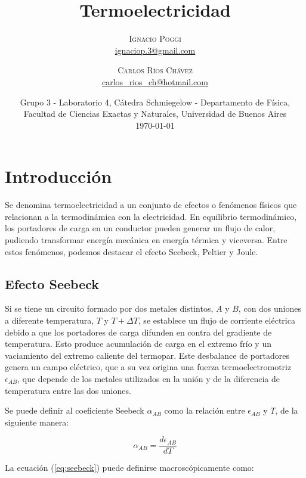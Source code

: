 \documentclass[twoside,twocolumn,a4paper]{article}
\title{Termoelectricidad} %
\author{%
\textsc{Ignacio Poggi} \\[1ex] %
\normalsize \href{mailto:ignaciop.3@gmail.com}{ignaciop.3@gmail.com} %
\and %
\textsc{Carlos R\'ios Ch\'avez} \\[1ex] %
\normalsize \href{mailto:carlos_rios_ch@hotmail.com}{carlos\_rios\_ch@hotmail.com} %
}
\date{Grupo 3 - Laboratorio 4, C\'atedra Schmiegelow - Departamento de F\'isica, Facultad de Ciencias Exactas y Naturales, Universidad de Buenos Aires \newline \\ \today} %
\begin{document}
\maketitle



\section{Introducci\'on}


Se denomina termoelectricidad a un conjunto de efectos o fen\'omenos f\'isicos que relacionan a la termodin\'amica con la electricidad. En equilibrio termodin\'amico, los portadores de carga en un conductor pueden generar un flujo de calor, pudiendo transformar energ\'ia mec\'anica en energ\'ia t\'ermica y viceversa. Entre estos fen\'omenos, podemos destacar el efecto Seebeck, Peltier y Joule.

\subsection{Efecto Seebeck}

Si se tiene un circuito formado por dos metales distintos, $A$ y $B$, con dos uniones a diferente temperatura, $T$ y $T + \Delta T$, se establece un flujo de corriente el\'ectrica debido a que los portadores de carga difunden en contra del gradiente de temperatura. Esto produce acumulaci\'on de carga en el extremo fr\'io y un vaciamiento del extremo caliente del termopar. Este desbalance de portadores genera un campo el\'ectrico, que a su vez origina una fuerza termoelectromotriz $\epsilon_{AB}$, que depende de los metales utilizados en la uni\'on y de la diferencia de temperatura entre las dos uniones.\newline

\par
Se puede definir al coeficiente Seebeck $\alpha_{AB}$ como la relaci\'on entre $\epsilon_{AB}$ y $T$, de la siguiente manera:

\begin{equation}
\label{eq:seebeck}
\alpha_{AB} = \frac{d\epsilon_{AB}}{dT}
\end{equation}

La ecuaci\'on (\ref{eq:seebeck}) puede definirse macrosc\'opicamente como:
\end{document}
